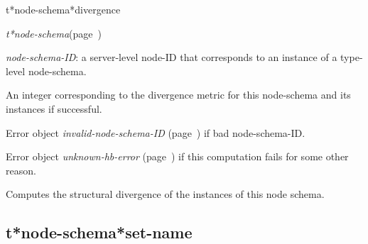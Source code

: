 \begin{description}
\item [Name:]  t*node-schema*divergence

\item [Class:] {\sl t*node-schema}\hfill(page~\pageref{t*node-schema})

\item [Parameters:]
\item {\sl node-schema-ID}:  a server-level node-ID that corresponds to an 
instance of a type-level node-schema. 



\item [Return-value:]
An integer corresponding to the divergence metric for 
this node-schema and its instances if successful.

Error object {\sl invalid-node-schema-ID} (page~\pageref{invalid-node-schema-ID}) if bad 
node-schema-ID.

Error object {\sl unknown-hb-error} (page~\pageref{unknown-hb-error}) if this computation
fails for some other reason.

\item [Description:]

Computes the structural divergence of the instances
of this node schema.

\item [Public:]



\end{description}
\horizontalline

\subsection{t*node-schema*set-name}
\label{t*node-schema*set-name}

